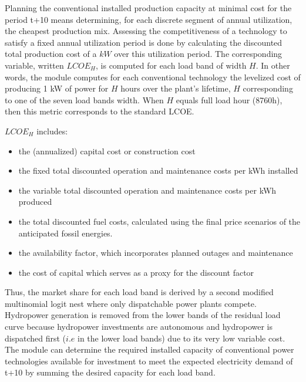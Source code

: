 Planning the conventional installed production capacity at minimal cost for the period t+10 means determining, for each discrete segment of annual utilization, the cheapest production mix.
Assessing the competitiveness of a technology to satisfy a fixed annual utilization period is done by calculating the discounted total production cost of a
$kW$ over this utilization period.
The corresponding variable, written $LCOE_{H}$, is computed for each load band of width $H$. In other words, the module computes for each conventional technology the levelized cost of producing 1 kW of power for $H$ hours over the plant's lifetime, $H$ corresponding to one of the seven load bands width. When $H$ equals full load hour (8760h), then this metric corresponds to the standard LCOE.

$LCOE_{H}$ includes:

\begin{itemize}
    \item the (annualized) capital cost or construction cost
    \item the fixed total discounted operation and maintenance costs per kWh installed
    \item the variable total discounted operation and maintenance costs per kWh produced
    \item the total discounted fuel costs, calculated using the final price scenarios of the anticipated fossil energies.
    \item  the availability factor, which incorporates planned outages and maintenance
    \item the cost of capital which serves as a proxy for the discount factor
\end{itemize}



Thus, the market share for each load band is derived by a second modified multinomial logit nest where only dispatchable power plants compete. Hydropower generation is removed from the lower bands of the residual load curve because hydropower investments are autonomous and hydropower is dispatched first ($i.e$ in the lower load bands) due to its very low variable cost. The module can determine the required installed capacity of conventional power technologies available for investment to meet the expected electricity demand of t+10 by summing the desired capacity for each load band.


